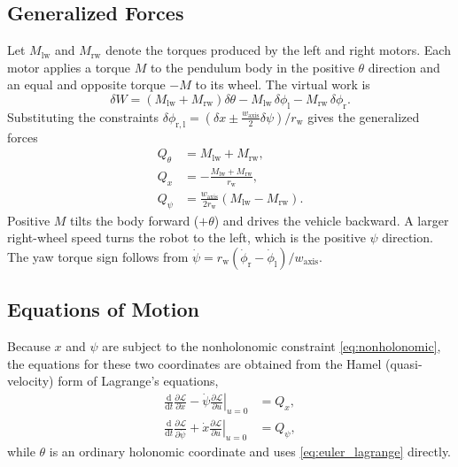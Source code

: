 \documentclass[journal]{IEEEtran}
\begin{document}
\subsection{Generalized Forces}

Let $M_{\mathrm{lw}}$ and $M_{\mathrm{rw}}$ denote the torques produced by
the left and right motors. Each motor applies a torque $M$ to the pendulum
body in the positive $\theta$ direction and an equal and opposite torque
$-M$ to its wheel. The virtual work is
\begin{equation}
    \delta W
    =
    \left(M_{\mathrm{lw}}+M_{\mathrm{rw}}\right)\delta\theta
    -
    M_{\mathrm{lw}}\,\delta\phi_{\mathrm l}
    -
    M_{\mathrm{rw}}\,\delta\phi_{\mathrm r}.
    \label{eq:virtual_work}
\end{equation}
Substituting the constraints
$\delta\phi_{\mathrm{r,l}}=\left(\delta x\pm\tfrac{w_{\mathrm{axis}}}{2}\delta\psi\right)/r_{\mathrm w}$
gives the generalized forces
\begin{align}
    Q_{\theta}
    &=
    M_{\mathrm{lw}}
    + M_{\mathrm{rw}},
    \label{eq:pendulum_motor_torque}
    \\
    Q_x
    &=
    -\frac{M_{\mathrm{lw}} + M_{\mathrm{rw}}}{r_{\mathrm w}},
    \label{eq:effective_motor_force}
    \\
    Q_{\psi}
    &=
    \frac{w_{\mathrm{axis}}}{2r_{\mathrm w}}
    \left(
        M_{\mathrm{lw}}
        -
        M_{\mathrm{rw}}
    \right).
    \label{eq:yaw_torque}
\end{align}
Positive $M$ tilts the body forward ($+\theta$) and drives the vehicle
backward. A larger right-wheel speed turns the robot to the left, which is
the positive $\psi$ direction. The yaw torque sign follows from
$\dot\psi = r_{\mathrm w}(\dot\phi_{\mathrm r}-\dot\phi_{\mathrm l})/w_{\mathrm{axis}}$.

\subsection{Equations of Motion}

Because $x$ and $\psi$ are subject to the nonholonomic constraint
\eqref{eq:nonholonomic}, the equations for these two coordinates are
obtained from the Hamel (quasi-velocity) form of Lagrange's equations,
\begin{align}
    \frac{\mathrm{d}}{\mathrm{d}t}
    \frac{\partial \mathcal{L}}{\partial \dot{x}}
    -
    \dot{\psi}
    \left.\frac{\partial \mathcal{L}}{\partial u}\right|_{u=0}
    &=
    Q_x,
    \label{eq:hamel_x}
    \\
    \frac{\mathrm{d}}{\mathrm{d}t}
    \frac{\partial \mathcal{L}}{\partial \dot{\psi}}
    +
    \dot{x}
    \left.\frac{\partial \mathcal{L}}{\partial u}\right|_{u=0}
    &=
    Q_\psi,
    \label{eq:hamel_psi}
\end{align}
while $\theta$ is an ordinary holonomic coordinate and uses
\eqref{eq:euler_lagrange} directly.
\end{document}
